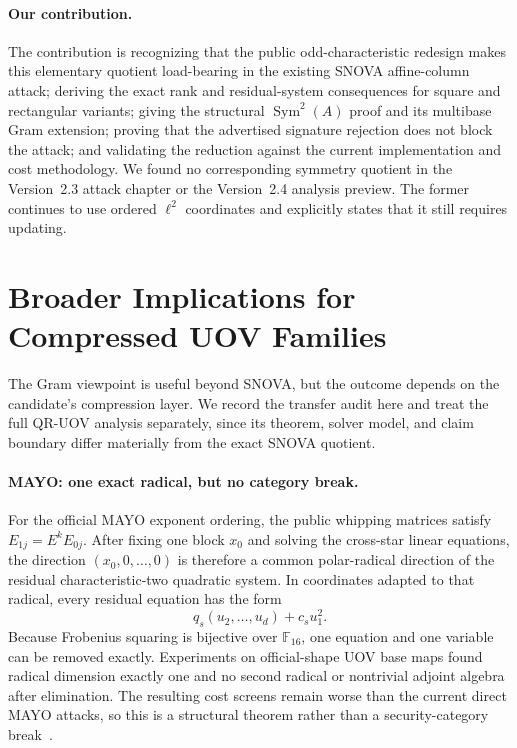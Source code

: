 \documentclass[runningheads]{llncs}
\newcommand{\F}{\mathbb F}
\newcommand{\Sym}{\operatorname{Sym}}
\newcommand{\SNOVA}{\textsf{SNOVA}}
\newcommand{\QRUOV}{\textsf{QR-UOV}}
\newcommand{\MAYO}{\textsf{MAYO}}
\begin{document}
\paragraph{Our contribution.}
The contribution is recognizing that the public odd-characteristic redesign makes this elementary quotient load-bearing in the existing \SNOVA{}
affine-column attack; deriving the exact rank and residual-system consequences
for square and rectangular variants; giving the structural
$\Sym^2(A)$ proof and its multibase Gram extension; proving that the advertised
signature rejection does not block the attack; and validating the reduction
against the current implementation and cost methodology.  We found no
corresponding symmetry quotient in the Version~2.3 attack chapter or the Version~2.4 analysis preview.  The former continues to use ordered $\ell^2$ coordinates and explicitly states that it still requires updating.

\section{Broader Implications for Compressed UOV Families}\label{sec:broader}

The Gram viewpoint is useful beyond \SNOVA{}, but the outcome depends on the candidate's compression layer.  We record the transfer audit here and treat the full \QRUOV{} analysis separately, since its theorem, solver model, and claim boundary differ materially from the exact \SNOVA{} quotient.

\paragraph{MAYO: one exact radical, but no category break.}
For the official \MAYO{} exponent ordering, the public whipping matrices satisfy $E_{1j}=E^kE_{0j}$.  After fixing one block $x_0$ and solving the cross-star linear equations, the direction $(x_0,0,\ldots,0)$ is therefore a common polar-radical direction of the residual characteristic-two quadratic system.  In coordinates adapted to that radical, every residual equation has the form
\[
 q_s(u_2,\ldots,u_d)+c_su_1^2.
\]
Because Frobenius squaring is bijective over $\F_{16}$, one equation and one variable can be removed exactly.  Experiments on official-shape UOV base maps found radical dimension exactly one and no second radical or nontrivial adjoint algebra after elimination.  The resulting cost screens remain worse than the current direct \MAYO{} attacks, so this is a structural theorem rather than a security-category break~\cite{MAYOSpec}.
\end{document}
